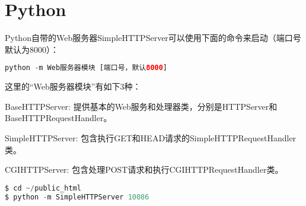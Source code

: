 \begin{lstlisting}[language=PHP]

\end{lstlisting}




\begin{lstlisting}[language=PHP]

\end{lstlisting}





\begin{lstlisting}[language=PHP]

\end{lstlisting}











\section{Python}


Python自带的Web服务器SimpleHTTPServer可以使用下面的命令来启动（端口号默认为8000）：



\begin{lstlisting}[language=PHP]
python -m Web服务器模块 [端口号，默认8000]
\end{lstlisting}


这里的“Web服务器模块”有如下3种：

\begin{compactitem}
\item BaseHTTPServer: 提供基本的Web服务和处理器类，分别是HTTPServer和BaseHTTPRequestHandler。
\item SimpleHTTPServer: 包含执行GET和HEAD请求的SimpleHTTPRequestHandler类。
\item CGIHTTPServer: 包含处理POST请求和执行CGIHTTPRequestHandler类。
\end{compactitem}

\begin{lstlisting}[language=PHP]
$ cd ~/public_html
$ python -m SimpleHTTPServer 10086
\end{lstlisting}

\begin{lstlisting}[language=PHP]

\end{lstlisting}




